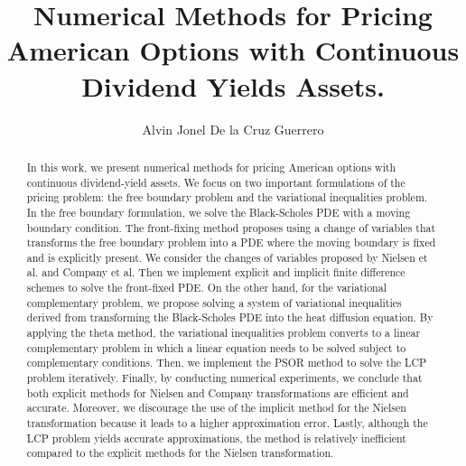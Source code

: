 \documentclass{uonmathreport}
\title{Numerical Methods for Pricing American Options with Continuous Dividend Yields Assets.}
\author{Alvin Jonel De la Cruz Guerrero}
\begin{document}
\maketitle

\begin{abstract}

  In this work, we present numerical methods for pricing American options with continuous dividend-yield assets. We focus on two important formulations of the pricing problem: the free boundary problem and the variational inequalities problem. In the free boundary formulation, we solve the Black-Scholes PDE with a moving boundary condition. The front-fixing method proposes using a change of variables that transforms the free boundary problem into a PDE where the moving boundary is fixed and is explicitly present. We consider the changes of variables proposed by Nielsen et al. and Company et al. Then we implement explicit and implicit finite difference schemes to solve the front-fixed PDE. On the other hand, for the variational complementary problem, we propose solving a system of variational inequalities derived from transforming the Black-Scholes PDE into the heat diffusion equation. By applying the theta method, the variational inequalities problem converts to a linear complementary problem in which a linear equation needs to be solved subject to complementary conditions. Then, we implement the PSOR method to solve the LCP problem iteratively. Finally, by conducting numerical experiments, we conclude that both explicit methods for Nielsen and Company transformations are efficient and accurate. Moreover, we discourage the use of the implicit method for the Nielsen transformation because it leads to a higher approximation error. Lastly, although the LCP problem yields accurate approximations, the method is relatively inefficient compared to the explicit methods for the Nielsen transformation.
\end{abstract}

\setcounter{tocdepth}{3}  %
\tableofcontents 
\newpage
{}




% 


% 
\newpage
\end{document}
